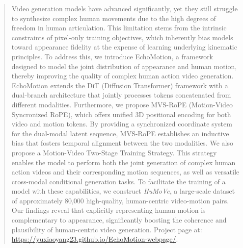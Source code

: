 \begin{abstract}
Video generation models have advanced significantly, yet they still struggle to synthesize complex human movements due to the high degrees of freedom in human articulation. This limitation stems from the intrinsic constraints of pixel-only training objectives, which inherently bias models toward appearance fidelity at the expense of learning underlying kinematic principles. To address this, we introduce EchoMotion, a framework designed to model the joint distribution of appearance and human motion, thereby improving the quality of complex human action video generation. EchoMotion extends the DiT (Diffusion Transformer) framework with a dual-branch architecture that jointly processes tokens concatenated from different modalities.
Furthermore, we propose MVS-RoPE (Motion-Video Syncronized RoPE), which offers unified 3D positional encoding for both video and motion tokens. By providing a synchronized coordinate system for the dual-modal latent sequence, MVS-RoPE establishes an inductive bias that fosters temporal alignment between the two modalities. We also propose a Motion-Video Two-Stage Training Strategy. This strategy enables the model to perform both the joint generation of complex human action videos and their corresponding motion sequences, as well as versatile cross-modal conditional generation tasks. 
To facilitate the training of a model with these capabilities, we construct \textit{HuMoVe}, a large-scale dataset of approximately 80,000 high-quality, human-centric video-motion pairs.
Our findings reveal that explicitly representing human motion is complementary to appearance, significantly boosting the coherence and plausibility of human-centric video generation. Project page at: \url{https://yuxiaoyang23.github.io/EchoMotion-webpage/}.
\end{abstract}
